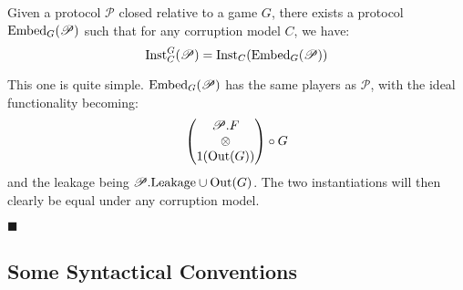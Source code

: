 \begin{lemma}
  Given a protocol $\mathscr{P}$ closed relative to a game $G$,
  there exists a protocol $\text{Embed}_G(\mathscr{P})$ such that for any
  corruption model $C$, we have:
  $$
  \text{Inst}^G_C(\mathscr{P}) = \text{Inst}_C(\text{Embed}_G(\mathscr{P}))
  $$

  This one is quite simple. $\text{Embed}_G(\mathscr{P})$ has the same players
  as $\mathscr{P}$, with the ideal functionality becoming:
  $$
  \begin{pmatrix}
    \mathscr{P}.F\cr
    \otimes\cr
    1(\text{Out}(G))
  \end{pmatrix}
  \circ G
  $$
  and the leakage being $\mathscr{P}.\text{Leakage} \cup \text{Out}(G)$.
  The two instantiations will then clearly be equal under any corruption model.

  $\blacksquare$
\end{lemma}

\subsection{Some Syntactical Conventions}
